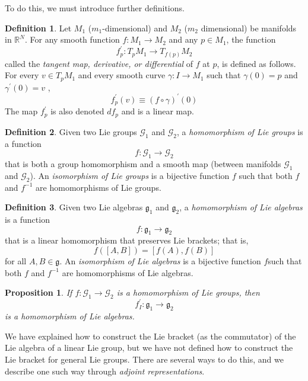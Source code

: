 \documentclass{article}
\newtheorem{proposition}[theorem]{Proposition}
\theoremstyle{remark}
\theoremstyle{definition}
\newtheorem{definition}{Definition}[section]
\begin{document}
To do this, we must introduce further definitions. 

\begin{definition}
Let $M_1$ ($m_1$-dimensional) and $M_2$ ($m_2$ dimensional) be manifolds in $\mathbb{R}^N$. For any smooth function $f: M_1 \longrightarrow M_2$ and any $p \in M_1$, the function 
\[f^\prime_p: T_p M_1 \longrightarrow T_{f(p)} M_2\]
called the \textit{tangent map, derivative, or differential} of $f$ at $p$, is defined as follows. For every $v \in T_p M_1$ and every smooth curve $\gamma: I \longrightarrow M_1$ such that $\gamma(0) = p$ and $\gamma^\prime (0) = v$ , 
\[f^\prime_p(v) \equiv (f \circ \gamma)^\prime (0)\]
The map $f^\prime_p$ is also denoted $d f_p$ and is a linear map. 
\end{definition}

\begin{definition}
Given two Lie groups $\mathcal{G}_1$ and $\mathcal{G}_2$, a \textit{homomorphism of Lie groups} is a function 
\[f: \mathcal{G}_1 \longrightarrow \mathcal{G}_2\]
that is both a group homomorphism and a smooth map (between manifolds $\mathcal{G}_1$ and $\mathcal{G}_2$). An \textit{isomorphism of Lie groups} is a bijective function $f$ such that both $f$ and $f^{-1}$ are homomorphisms of Lie groups. 
\end{definition}

\begin{definition}
Given two Lie algebras $\mathfrak{g}_1$ and $\mathfrak{g}_2$, a \textit{homomorphism of Lie algebras} is a function 
\[f: \mathfrak{g}_1 \longrightarrow \mathfrak{g}_2\]
that is a linear homomorphism that preserves Lie brackets; that is, 
\[f([A,B]) = [f(A), f(B)]\]
for all $A, B \in \mathfrak{g}$. An \textit{isomorphism of Lie algebras} is a bijective function $f$such that both $f$ and $f^{-1}$ are homomorphisms of Lie algebras. 
\end{definition}

\begin{proposition}
If $f: \mathcal{G}_1 \longrightarrow \mathcal{G}_2$ is a homomorphism of Lie groups, then 
\[f_I^\prime: \mathfrak{g}_1 \longrightarrow \mathfrak{g}_2\]
is a homomorphism of Lie algebras. 
\end{proposition}

We have explained how to construct the Lie bracket (as the commutator) of the Lie algebra of a linear Lie group, but we have not defined how to construct the Lie bracket for general Lie groups. There are several ways to do this, and we describe one such way through \textit{adjoint representations}. 
\end{document}
